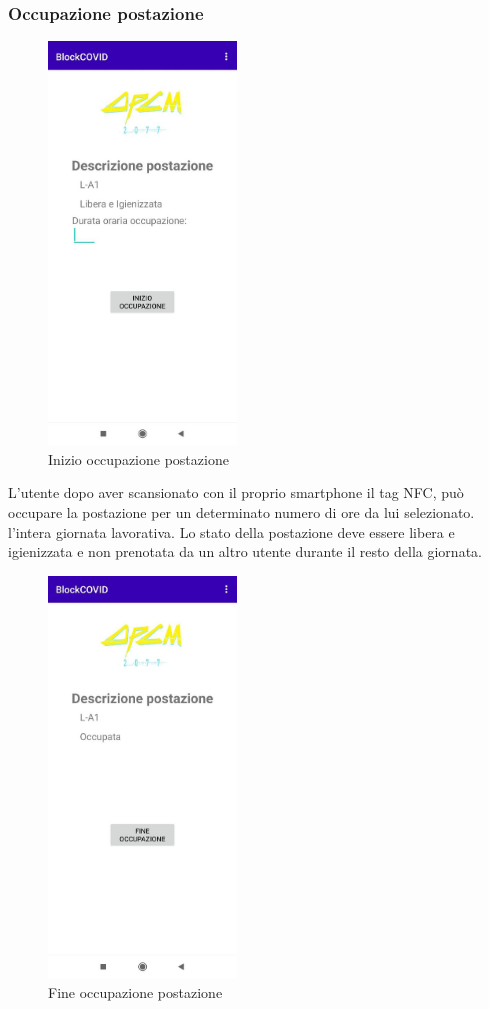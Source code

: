 	\subsubsection{Occupazione postazione}
	\begin{figure}[H]
		\centering
		\includegraphics[width=5cm]{res/images/inizioOccupazione.png}
		\caption{Inizio occupazione postazione}
	\end{figure}
	L'utente dopo aver scansionato con il proprio smartphone il tag NFC, può occupare la postazione per un determinato numero di ore da lui selezionato.
	l’intera giornata lavorativa. Lo stato della postazione deve essere libera e igienizzata e non prenotata da un altro utente durante il resto della giornata.
	\begin{figure}[H]
		\centering
		\includegraphics[width=5cm]{res/images/occupata.png}
		\caption{Fine occupazione postazione}
	\end{figure}
